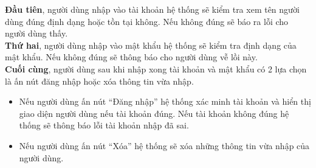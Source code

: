 \documentclass[a4paper]{article}
\begin{document}
\noindent \textbf{Đầu tiên}, người dùng nhập vào tài khoản hệ thống sẽ kiểm tra xem tên người dùng đúng định dạng hoặc tồn tại không. Nếu không đúng sẽ báo ra lỗi cho người dùng thấy. \\
\noindent \textbf{Thứ hai}, người dùng nhập vào mật khẩu hệ thống sẽ kiểm tra định dạng của mật khẩu. Nếu không đúng sẽ thông báo cho người dùng vễ lồi này.\\
\noindent \textbf{Cuối cùng}, người dùng sau khi nhập xong tài khoản và mật khẩu có 2 lựa chọn là ấn nút đăng nhập hoặc xóa thông tin vừa nhập.
\begin{itemize}
    \item Nếu người dùng ấn nút “Đăng nhập” hệ thống xác minh tài khoản và hiển thị giao diện người dùng nếu tài khoản đúng. Nếu tài khoản không đúng hệ thống sẽ thông báo lỗi tài khoản nhập đã sai.
    \item Nếu người dùng ấn nút “Xóa” hệ thống sẽ xóa những thông tin vừa nhập của người dùng.
\end{itemize}

\newpage
\end{document}
